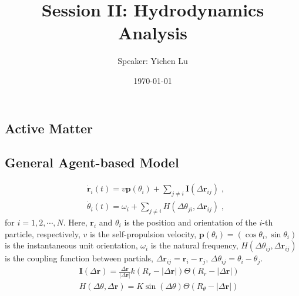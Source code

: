 \documentclass[10pt,aspectratio=43,mathserif,table]{beamer}
\title{Session II: \textbf{Hydrodynamics Analysis}}
\author{Speaker: Yichen Lu\quad \newline  \newline \quad }
\institute{School of Mathematical Science}
\date{\today}
\begin{document}

\subsection{Active Matter}
\begin{frame}
\end{frame}

\subsection{General Agent-based Model}
\begin{frame}
    \small
    \begin{subequations}
        \begin{align}
            &\dot{\mathbf{r}}_i\left( t \right) =v\mathbf{p}\left( \theta _i \right) +\sum_{j\ne i}{\mathbf{I}\left( \Delta \mathbf{r}_{ij} \right) }\;,\\
            &\dot{\theta}_i\left( t \right) =\omega _i +\sum_{j\ne i}{H\left( \Delta \theta _{ji},\Delta \mathbf{r}_{ij} \right)}\;,
        \end{align}
    \end{subequations}
    for $i=1,2,\cdots,N$. Here, $\mathbf{r}_i$ and $\theta _i$ is the position and orientation of the $i$-th particle, respectively,
    $v$ is the self-propulsion velocity, $\mathbf{p}\left( \theta _i \right)=\left( \cos \theta _i,\sin \theta _i \right)$ is the instantaneous unit orientation, $\omega _i$ is the natural frequency, $H\left( \Delta \theta _{ij},\Delta \mathbf{r}_{ij} \right)$ is the coupling function between partials, $\Delta \mathbf{r}_{ij}=\mathbf{r}_i-\mathbf{r}_j$, $\Delta \theta _{ij}=\theta _i-\theta _j$.
    \begin{eqnarray}
        &&\mathbf{I}\left( \Delta \mathbf{r} \right) =\frac{\Delta \mathbf{r}}{\left| \Delta \mathbf{r} \right|}k\left( R_r-\left| \Delta \mathbf{r} \right| \right) \Theta \left( R_r-\left| \Delta \mathbf{r} \right| \right) \\
        &&H\left( \Delta \theta ,\Delta \mathbf{r} \right) =K\sin \left( \Delta \theta \right) \Theta \left( R_{\theta}-\left| \Delta \mathbf{r} \right| \right) 
    \end{eqnarray}
\end{frame}
\end{document}
